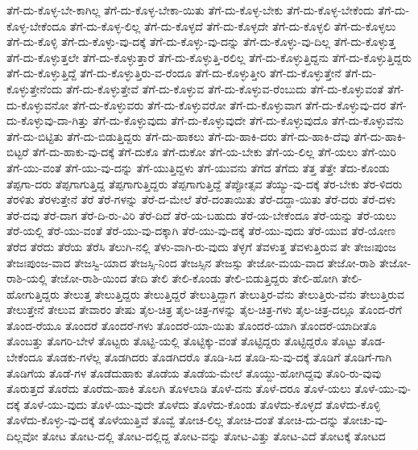 {ತೆಗೆ-ದು-ಕೊಳ್ಳ-ಬೇ-ಕಾಗಿಲ್ಲ
ತೆಗೆ-ದು-ಕೊಳ್ಳ-ಬೇಕಾ-ಯಿತು
ತೆಗೆ-ದು-ಕೊಳ್ಳ-ಬೇಕು
ತೆಗೆ-ದು-ಕೊಳ್ಳ-ಬೇಕೆಂದು
ತೆಗೆ-ದು-ಕೊಳ್ಳ-ಬೇಕೆಂದೂ
ತೆಗೆ-ದು-ಕೊಳ್ಳ-ಲಿಲ್ಲ
ತೆಗೆ-ದು-ಕೊಳ್ಳದೆ
ತೆಗೆ-ದು-ಕೊಳ್ಳದೇ
ತೆಗೆ-ದು-ಕೊಳ್ಳಲಿ
ತೆಗೆ-ದು-ಕೊಳ್ಳಲು
ತೆಗೆ-ದು-ಕೊಳ್ಳಿ
ತೆಗೆ-ದು-ಕೊಳ್ಳು-ವು-ದಕ್ಕೆ
ತೆಗೆ-ದು-ಕೊಳ್ಳು-ವು-ದನ್ನು
ತೆಗೆ-ದು-ಕೊಳ್ಳು-ವು-ದಿಲ್ಲ
ತೆಗೆ-ದು-ಕೊಳ್ಳುತ್ತ
ತೆಗೆ-ದು-ಕೊಳ್ಳುತ್ತಲೇ
ತೆಗೆ-ದು-ಕೊಳ್ಳುತ್ತಾರೆ
ತೆಗೆ-ದು-ಕೊಳ್ಳುತ್ತಿ-ರಲಿಲ್ಲ
ತೆಗೆ-ದು-ಕೊಳ್ಳುತ್ತಿದ್ದನು
ತೆಗೆ-ದು-ಕೊಳ್ಳುತ್ತಿದ್ದರು
ತೆಗೆ-ದು-ಕೊಳ್ಳುತ್ತಿದ್ದೆ
ತೆಗೆ-ದು-ಕೊಳ್ಳುತ್ತಿರು-ವ-ರೆಂದೂ
ತೆಗೆ-ದು-ಕೊಳ್ಳುತ್ತೀರಿ
ತೆಗೆ-ದು-ಕೊಳ್ಳುತ್ತೇನೆ
ತೆಗೆ-ದು-ಕೊಳ್ಳುತ್ತೇನೆಂದು
ತೆಗೆ-ದು-ಕೊಳ್ಳುತ್ತೇವೆ
ತೆಗೆ-ದು-ಕೊಳ್ಳುವ
ತೆಗೆ-ದು-ಕೊಳ್ಳುವ-ರೆಂಬುದು
ತೆಗೆ-ದು-ಕೊಳ್ಳುವಂತೆ
ತೆಗೆ-ದು-ಕೊಳ್ಳುವನೋ
ತೆಗೆ-ದು-ಕೊಳ್ಳುವರು
ತೆಗೆ-ದು-ಕೊಳ್ಳುವರೋ
ತೆಗೆ-ದು-ಕೊಳ್ಳುವಾಗ
ತೆಗೆ-ದು-ಕೊಳ್ಳುವು-ದರ
ತೆಗೆ-ದು-ಕೊಳ್ಳುವು-ದಾ-ಗಿತ್ತು
ತೆಗೆ-ದು-ಕೊಳ್ಳುವುದು
ತೆಗೆ-ದು-ಕೊಳ್ಳುವುದೇ
ತೆಗೆ-ದು-ಕೊಳ್ಳುವುದೊ
ತೆಗೆ-ದು-ಕೊಳ್ಳುವೆನು
ತೆಗೆ-ದು-ಬಿಟ್ಟಿತು
ತೆಗೆ-ದು-ಬಿಡುತ್ತಿದ್ದರು
ತೆಗೆ-ದು-ಹಾಕಲು
ತೆಗೆ-ದು-ಹಾಕಿ-ದರು
ತೆಗೆ-ದು-ಹಾಕಿ-ದೆವು
ತೆಗೆ-ದು-ಹಾಕಿ-ಬಿಟ್ಟರೆ
ತೆಗೆ-ದು-ಹಾಕು-ವು-ದಕ್ಕೆ
ತೆಗೆ-ದುಕೊ
ತೆಗೆ-ದುಕೋ
ತೆಗೆ-ಯ-ಬೇಕು
ತೆಗೆ-ಯ-ಲಿಲ್ಲ
ತೆಗೆ-ಯಲು
ತೆಗೆ-ಯಿರಿ
ತೆಗೆ-ಯು-ವಂತೆ
ತೆಗೆ-ಯು-ವು-ದನ್ನು
ತೆಗೆ-ಯುತ್ತಿದ್ದಳು
ತೆಗೆ-ಯುವನು
ತೆಗೆದ
ತೆಗೆದು
ತೆತ್ತ
ತೆತ್ತೇ
ತೆದು-ಕೊಂಡು
ತೆಪ್ಪಗಾ-ದರು
ತೆಪ್ಪಗಾಗುತ್ತಿದ್ದ
ತೆಪ್ಪಗಾಗುತ್ತಿದ್ದರು
ತೆಪ್ಪಗಾಗುತ್ತಿದ್ದೆ
ತೆಪ್ಪೋತ್ಸವ
ತೆಯ್ಯು-ವು-ದಕ್ಕೆ
ತೆರ-ಬೇಕು
ತೆರ-ಳಿದರು
ತೆರಳಿತು
ತೆರಳುತ್ತೇನೆ
ತೆರೆ
ತೆರೆ-ಗಳನ್ನು
ತೆರೆ-ದ-ಮೇಲೆ
ತೆರೆ-ದಂತಾಯಿತು
ತೆರೆ-ದದ್ದಾ-ಯಿತು
ತೆರೆ-ದರು
ತೆರೆ-ದಳು
ತೆರೆ-ದವು
ತೆರೆ-ದಾಗ
ತೆರೆ-ದಿ-ರು-ವಿರಿ
ತೆರೆ-ದಿದೆ
ತೆರೆ-ಯ-ಬಹುದು
ತೆರೆ-ಯ-ಬೇಕೆಂದೂ
ತೆರೆ-ಯನ್ನು
ತೆರೆ-ಯಲು
ತೆರೆ-ಯಲ್ಲಿ
ತೆರೆ-ಯು-ವಂತೆ
ತೆರೆ-ಯು-ವು-ದಕ್ಕಾಗಿ
ತೆರೆ-ಯು-ವು-ದಕ್ಕೆ
ತೆರೆ-ಯು-ವುದು
ತೆರೆ-ಯುವ
ತೆರೆ-ಯೋಣ
ತೆರೆದ
ತೆರೆದು
ತೆರೆಯ
ತೆರೆಸಿ
ತೆಲುಗಿ-ನಲ್ಲಿ
ತೆಳು-ವಾಗಿ-ರು-ವುದು
ತೆಳ್ಳಗೆ
ತೆವಳುತ್ತ
ತೆವಳುತ್ತಿರುವ
ತೇ
ತೇಜಃಪುಂಜ
ತೇಜಃಪುಂಜ-ವಾದ
ತೇಜಸ್ವಿ-ಯಾದ
ತೇಜಸ್ಸಿ-ನಿಂದ
ತೇಜಸ್ಸಿನ
ತೇಜಸ್ಸು
ತೇಜೋ-ಮಯ-ವಾದ
ತೇಜೋ-ರಾಶಿ
ತೇಜೋ-ರಾಶಿ-ಯಲ್ಲಿ
ತೇಜೋ-ರಾಶಿ-ಯಿಂದ
ತೇದಿ
ತೇಲಿ
ತೇಲಿ-ಕೊಂಡು
ತೇಲಿ-ಬಿಡುತ್ತಿದ್ದರು
ತೇಲಿ-ಹೋಗಿ
ತೇಲಿ-ಹೋಗುತ್ತಿದ್ದರು
ತೇಲುತ್ತ
ತೇಲುತ್ತಿದ್ದರು
ತೇಲುತ್ತಿದ್ದರೆ
ತೇಲುತ್ತಿದ್ದಾಗ
ತೇಲುತ್ತಿರ-ವೆನು
ತೇಲುತ್ತಿರು-ವೆನು
ತೇಲುತ್ತಿರುವ
ತೇಲುತ್ತೇನೆ
ತೇಲುವ
ತೇವಾರಂ
ತೇಷು
ತೈಲ-ಚಿತ್ರ
ತೈಲ-ಚಿತ್ರ-ಗಳನ್ನು
ತೈಲ-ಚಿತ್ರ-ಗಳು
ತೈಲ-ಚಿತ್ರ-ದಲ್ಲೂ
ತೊಂದ-ರೆಗೆ
ತೊಂದ-ರೆಯೂ
ತೊಂದರೆ
ತೊಂದರೆ-ಗಳು
ತೊಂದರೆ-ಯಾ-ಯಿತು
ತೊಂದರೆ-ಯಾಗಿ
ತೊಂದರೆ-ಯಾದೀತೊ
ತೊಂಬತ್ತು
ತೊಗರಿ-ಬೇಳೆ
ತೊಟ್ಟರು
ತೊಟ್ಟಿ-ಯಲ್ಲಿ
ತೊಟ್ಟಿಕ್ಕು-ವಂತೆ
ತೊಟ್ಟಿದ್ದರು
ತೊಟ್ಟಿದ್ದರೊ
ತೊಟ್ಟು
ತೊಡ-ಬೇಕೆಂದೂ
ತೊಡಕು-ಗಳೆಲ್ಲ
ತೊಡಗಿದರು
ತೊಡಗಿದರೊ
ತೊಡಿ-ಸಿದ
ತೊಡಿ-ಸು-ವು-ದಕ್ಕೆ
ತೊಡಿಗೆ
ತೊಡಿಗೆ-ಗಾಗಿ
ತೊಡಿಗೆಯ
ತೊಡೆ-ಗಳ
ತೊಡೆದುಹಾಕು
ತೊಡೆಯ
ತೊಡೆಯ-ಮೇಲೆ
ತೊಯ್ದು-ಹೋಗಿದ್ದವು
ತೊರಿ-ರು-ವುವು
ತೊರುತ್ತದೆ
ತೊರೆದು
ತೊರೆದು-ಹಾಕಿ
ತೊಲಗಿ
ತೊಳಲಾಡಿ
ತೊಳೆ-ದನು
ತೊಳೆ-ದರೂ
ತೊಳೆ-ಯಲು
ತೊಳೆ-ಯು-ವು-ದಕ್ಕೆ
ತೊಳೆ-ಯು-ವುದು
ತೊಳೆ-ಯು-ವುದೇ
ತೊಳೆದು
ತೊಳೆದು-ಕೊಂಡು
ತೊಳೆದು-ಕೊಳ್ಳದೆ
ತೊಳೆದು-ಕೊಳ್ಳಿ
ತೊಳೆದು-ಕೊಳ್ಳು-ವು-ದಕ್ಕೆ
ತೊಳೆಯುತ್ತಿವೆ
ತೊವ್ವೆ
ತೋಚ-ಲಿಲ್ಲ
ತೋಚಿ-ದಂತೆ
ತೋಚಿ-ದು-ದನ್ನು
ತೋಚು-ವು-ದಿಲ್ಲವೋ
ತೋಟ
ತೋಟ-ದಲ್ಲಿ
ತೋಟ-ದಲ್ಲಿದ್ದ
ತೋಟ-ವನ್ನು
ತೋಟ-ವಿತ್ತು
ತೋಟ-ವಿದೆ
ತೋಟಕ್ಕೆ
ತೋಟದ
}
